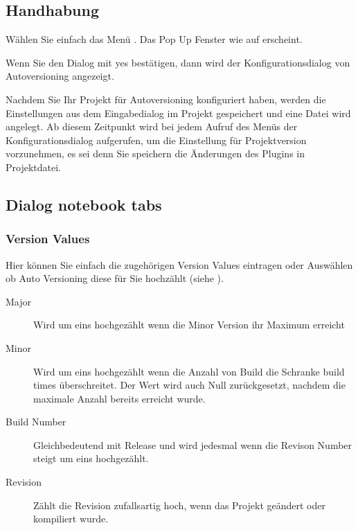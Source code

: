 \subsection{Handhabung}

Wählen Sie einfach das Menü . Das Pop Up Fenster wie auf  erscheint.


Wenn Sie den Dialog mit yes bestätigen, dann wird der Konfigurationsdialog von Autoversioning angezeigt.

Nachdem Sie Ihr Projekt für Autoversioning konfiguriert haben, werden die Einstellungen aus dem Eingabedialog im Projekt gespeichert und eine Datei  wird angelegt. Ab diesem Zeitpunkt wird bei jedem Aufruf des Menüs  der Konfigurationsdialog aufgerufen, um die Einstellung für Projektversion vorzunehmen, es sei denn Sie speichern die Änderungen des Plugins in Projektdatei.

\subsection{Dialog notebook tabs}
\subsubsection{Version Values}

Hier können Sie einfach die zugehörigen Version Values eintragen oder Auswählen ob Auto Versioning diese für Sie hochzählt (siehe ).

\begin{description}
\item[Major] Wird um eins hochgezählt wenn die Minor Version ihr Maximum erreicht
\item[Minor] Wird um eins hochgezählt wenn die Anzahl von Build die Schranke build times überschreitet. Der Wert wird auch Null zurückgesetzt, nachdem die maximale Anzahl bereits erreicht wurde.
\item[Build Number] Gleichbedeutend mit Release und wird jedesmal wenn die Revison Number steigt um eins hochgezählt.
\item[Revision] Zählt die Revision zufallsartig hoch, wenn das Projekt geändert oder kompiliert wurde.
\end{description}


